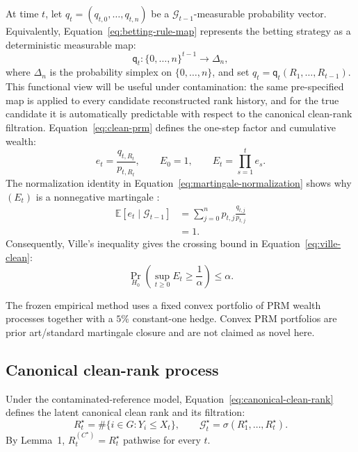 At time \(t\), let \(q_t=(q_{t,0},\ldots,q_{t,n})\) be a \(\mathcal G_{t-1}\)-measurable probability vector. Equivalently, Equation~\eqref{eq:betting-rule-map} represents the betting strategy as a deterministic measurable map:
\begin{equation}
\mathsf q_t:
  \{0,\ldots,n\}^{t-1}
  \longrightarrow
  \Delta_n,
  \label{eq:betting-rule-map}
\end{equation}
where \(\Delta_n\) is the probability simplex on \(\{0,\ldots,n\}\), and set
\(q_t=\mathsf q_t(R_1,\ldots,R_{t-1}).\)
This functional view will be useful under contamination: the same pre-specified map is applied to every candidate reconstructed rank history, and for the true candidate it is automatically predictable with respect to the canonical clean-rank filtration. Equation~\eqref{eq:clean-prm} defines the one-step factor and cumulative wealth:
\begin{equation}
  e_t=\frac{q_{t,R_t}}{p_{t,R_t}},
  \qquad
  E_0=1,
  \qquad
  E_t=\prod_{s=1}^t e_s.
  \label{eq:clean-prm}
\end{equation}
The normalization identity in Equation~\eqref{eq:martingale-normalization} shows why \((E_t)\) is a nonnegative martingale \cite{KuangXia2026}:
\begin{equation}
\begin{aligned}
\mathbb E[e_t\mid\mathcal G_{t-1}]
&=\sum_{j=0}^n p_{t,j}\frac{q_{t,j}}{p_{t,j}}\\
&=1.
\end{aligned}
\label{eq:martingale-normalization}
\end{equation}
Consequently, Ville's inequality gives the crossing bound in Equation~\eqref{eq:ville-clean}:
\begin{equation}
  \Pr_{H_0}\!\left(
    \sup_{t\ge0}E_t\ge\frac1\alpha
  \right)\le\alpha.
  \label{eq:ville-clean}
\end{equation}

The frozen empirical method uses a fixed convex portfolio of PRM wealth processes together with a \(5\%\) constant-one hedge. Convex PRM portfolios are prior art/standard martingale closure and are not claimed as novel here.


\subsection{Canonical clean-rank process}

Under the contaminated-reference model, Equation~\eqref{eq:canonical-clean-rank} defines the latent canonical clean rank and its filtration:
\begin{equation}
  R_t^\star
  =
  \#\{i\in G:Y_i\le X_t\},
  \qquad
  \mathcal G_t^\star
  =
  \sigma(R_1^\star,\ldots,R_t^\star).
  \label{eq:canonical-clean-rank}
\end{equation}
By Lemma~1,
\(R_t^{(C^\star)}=R_t^\star\)
pathwise for every \(t\).

